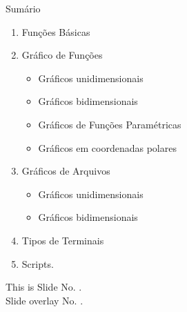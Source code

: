 \documentclass{article}
\begin{document}

\begin{slide}
\tableofcontents
\end{slide}

\begin{slide}
{\Huge \color{blue} Sumário}
\vfill
  \begin{enumerate}
    \item Funções Básicas
    \item Gráfico de Funções
    \begin{itemize}
       \item Gráficos unidimensionais 
       \item Gráficos bidimensionais 
       \item Gráficos de Funções Paramétricas
       \item Gráficos em coordenadas polares
    \end{itemize}
    \item Gráficos de Arquivos %
    \begin{itemize}
       \item Gráficos unidimensionais 
       \item Gráficos bidimensionais
    \end{itemize}
    \item Tipos de Terminais 
    \item Scripts.
  \end{enumerate}
\end{slide}


\begin{slide}\Huge\color{orange}\centering
This is  Slide No. \theslide.\\
\color{blue}\large Slide overlay No. \theslideoverlay.\\
\end{slide}
\end{document}
